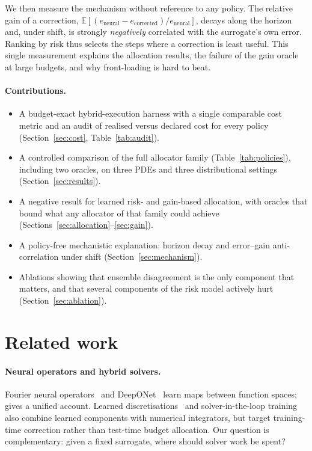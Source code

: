 \documentclass[11pt]{article}
\begin{document}
We then measure the mechanism without reference to any policy. The relative
gain of a correction, $\mathbb{E}[(e_{\text{neural}}-e_{\text{corrected}})/e_{\text{neural}}]$,
decays along the horizon and, under shift, is strongly \emph{negatively}
correlated with the surrogate's own error. Ranking by risk thus selects the
steps where a correction is least useful. This single measurement explains the
allocation results, the failure of the gain oracle at large budgets, and why
front-loading is hard to beat.

\paragraph{Contributions.}
\begin{itemize}
\item A budget-exact hybrid-execution harness with a single comparable cost
  metric and an audit of realised versus declared cost for every policy
  (Section~\ref{sec:cost}, Table~\ref{tab:audit}).
\item A controlled comparison of the full allocator family
  (Table~\ref{tab:policies}), including two oracles, on three PDEs and three
  distributional settings (Section~\ref{sec:results}).
\item A negative result for learned risk- and gain-based allocation, with
  oracles that bound what any allocator of that family could achieve
  (Sections~\ref{sec:allocation}--\ref{sec:gain}).
\item A policy-free mechanistic explanation: horizon decay and error--gain
  anti-correlation under shift (Section~\ref{sec:mechanism}).
\item Ablations showing that ensemble disagreement is the only component that
  matters, and that several components of the risk model actively hurt
  (Section~\ref{sec:ablation}).
\end{itemize}

\section{Related work}

\paragraph{Neural operators and hybrid solvers.} Fourier neural
operators~\cite{li2021fno} and DeepONet~\cite{lu2021deeponet} learn maps between
function spaces; \cite{kovachki2023neural} gives a unified account. Learned
discretisations~\cite{barsinai2019learning} and solver-in-the-loop
training~\cite{um2020solver} also combine learned components with numerical
integrators, but target training-time correction rather than test-time budget
allocation. Our question is complementary: given a fixed surrogate, where should
solver work be spent?
\end{document}

